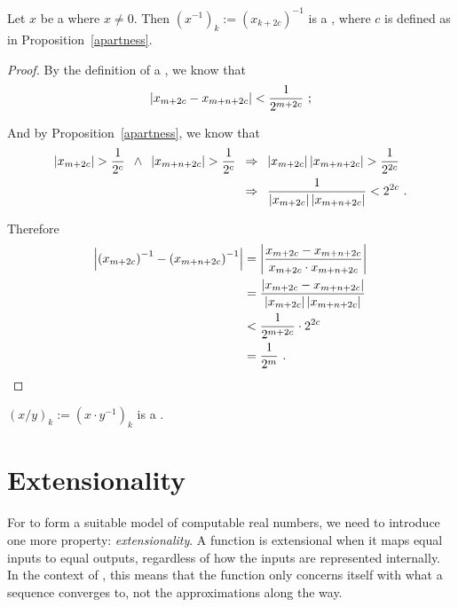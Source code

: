 \documentclass[leqno]{report}
\begin{document}
\begin{Proposition}[Reciprocal]
    Let $x$ be a \FCCS{} where $x \neq 0$. Then $\left(x^{-1}\right)_k := \left(x_{k+2c}\right)^{-1}$ is a \FCCS, where $c$ is defined as in Proposition~\ref{apartness}.
\end{Proposition}

\begin{proof}
    By the definition of a \FCCS, we know that
    \[
        \left| x_{m+2c} - x_{m+n+2c} \right| < \frac{1}{2^{m+2c}} \ ;
    \]

    And by Proposition~\ref{apartness}, we know that
    \begin{align*}
        \left| x_{m+2c} \right| > \frac{1}{2^c} \enspace\wedge\enspace
        \left| x_{m+n+2c} \right| > \frac{1}{2^c}
        \enspace&\Rightarrow\enspace
        \left| x_{m+2c} \right| \left| x_{m+n+2c} \right| > \frac{1}{2^{2c}} \\
        &\Rightarrow\enspace
        \frac{1}{\left| x_{m+2c} \right| \left| x_{m+n+2c} \right|} < 2^{2c} \ .
    \end{align*}

    Therefore
    \begin{align*}
        \left| \left(x_{m+2c}\right)^{-1} - \left(x_{m+n+2c}\right)^{-1} \right|
        &= \left| \frac{x_{m+2c} - x_{m+n+2c}}{x_{m+2c} \cdot x_{m+n+2c}} \right| \\
        &= \frac{\left| x_{m+2c} - x_{m+n+2c} \right|}{\left| x_{m+2c} \right| \left| x_{m+n+2c} \right|} \\
        &< \frac{1}{2^{m+2c}} \cdot 2^{2c} \\
        &= \frac{1}{2^m} \ . \qedhere
    \end{align*}
\end{proof}

\begin{Corollary}[Division]
    $(x/y)_k := \left(x \cdot y^{-1}\right)_k$ is a \FCCS.
\end{Corollary}

\section{Extensionality}


For \FCCS{} to form a suitable model of computable real numbers, we need to introduce one more property: \textit{extensionality}. A function is extensional when it maps equal inputs to equal outputs, regardless of how the inputs are represented internally. In the context of \FCCS, this means that the function only concerns itself with what a sequence converges to, not the approximations along the way.
\end{document}
